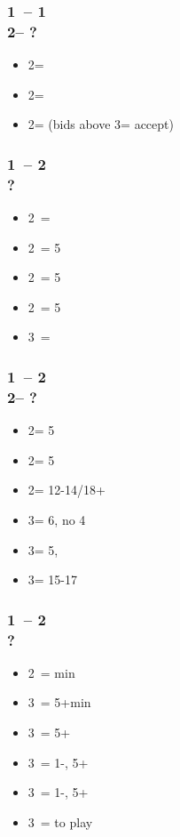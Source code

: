 \subsubsection*{1\clubs\ -- 1\spades \\ 
                2\clubs -- ?}
\begin{itemize}
    \item 2\diams = \gf
    \item 2\hearts = \inv \nat
    \item 2\nt = \inv (bids above 3\clubs = accept)
\end{itemize}

\subsubsection*{1\clubs\ -- 2\clubs \\ ?}
\begin{itemize}
    \item 2\diams\ = \bal
    \item 2\hearts\ = 5\hearts\ \unbal
    \item 2\spades\ = 5\spades\ \unbal
    \item 2\nt\ = 5\diams\ \unbal
    \item 3\clubs\ = \clubs\ \unbal
\end{itemize}

\subsubsection*{1\clubs\ -- 2\clubs \\
                2\diams -- ?}
\begin{itemize}
    \item 2\hearts = 5\hearts\ \unbal
    \item 2\spades = 5\spades\ \unbal
    \item 2\nt = 12-14/18+ \bal
    \item 3\clubs = 6\clubs, no 4\major
    \item 3\diams = 5\diams, \gf
    \item 3\nt = 15-17 \bal
\end{itemize}

\subsubsection*{1\clubs\ -- 2\spades \\ ?}
\begin{itemize}
    \item 2\nt\ = \bal min
    \item 3\clubs\ = 5+\clubs min
    \item 3\diams\ = 5+\clubs\ \gf
    \item 3\hearts\ = 1-\hearts, 5+\clubs\ \gf
    \item 3\spades\ = 1-\spades, 5+\clubs\ \gf
    \item 3\nt\ = to play
\end{itemize}

